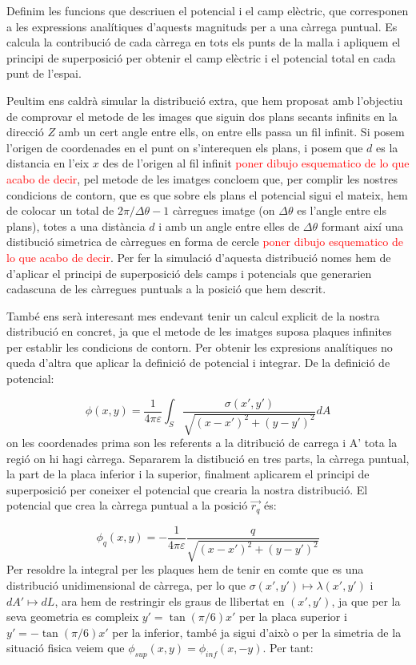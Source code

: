 \documentclass[a4paper,10.5pt]{report}
\begin{document}
Definim les funcions que descriuen el potencial i el camp elèctric, que corresponen a les expressions analítiques d'aquests magnituds per a una càrrega puntual. Es calcula la contribució de cada càrrega en tots els punts de la malla i  apliquem el principi de superposició per obtenir el camp elèctric i el potencial total en cada punt de l’espai.

Peultim ens caldrà simular la distribució extra, que hem proposat amb l'objectiu de comprovar el metode de les images que siguin dos plans secants infinits en la direcció $Z$ amb un cert angle entre ells, on entre ells passa un fil infinit. Si posem l'origen de coordenades en el punt on s'interequen els plans, i posem que $d$ es la distancia en l'eix $x$ des de l'origen al fil infinit \textcolor{red}{poner dibujo esquematico de  lo que acabo de decir}, pel metode de les imatges concloem que, per complir les nostres condicions de contorn, que es que sobre els plans el potencial sigui el mateix, hem de colocar un total de $2\pi/\Delta\theta-1$ càrregues imatge (on $\Delta\theta$ es l'angle entre els plans), totes a una distància $d$ i amb un angle entre elles de $\Delta\theta$ formant així una distibució simetrica de càrregues en forma de cercle \textcolor{red}{poner dibujo esquematico de lo que acabo de decir}. 
Per fer la simulació d'aquesta distribució nomes hem de d'aplicar el principi de superposició dels camps i potencials que generarien cadascuna de les càrregues puntuals a la posició que hem descrit.

També ens serà interesant mes endevant tenir un calcul explicit de la nostra distribució en concret, ja que el metode de les imatges suposa plaques infinites per establir les condicions de contorn. Per obtenir les expresions analítiques no queda d'altra que aplicar la definició de potencial i integrar. De la definició de potencial:

\begin{equation}
	\phi (x,y) = \frac{1}{4\pi\varepsilon}\int_S\frac{\sigma(x',y')}{\sqrt{(x-x')^2+(y-y')^2}}dA
\end{equation}
on les coordenades prima son les referents a la ditribució de carrega i A' tota la regió on hi hagi càrrega. Separarem la distibució en tres parts, la càrrega puntual, la part de la placa inferior i la superior, finalment aplicarem el principi de superposició per coneixer el potencial que crearia la nostra distribució. El potencial que crea la càrrega puntual a la posició $\vec{r_q}$ és:

\begin{equation}
	\phi_q (x,y) = -\frac{1}{4\pi\varepsilon}\frac{q}{\sqrt{(x-x')^2+(y-y')^2}}
\end{equation}
Per resoldre la integral per les plaques hem de tenir en comte que es una distribució unidimensional de càrrega, per lo que $\sigma(x',y') \longmapsto \lambda(x',y')$ i $dA' \longmapsto dL$, ara hem de restringir els graus de llibertat en $(x',y')$, ja que per la seva geometria es compleix $y' = \tan(\pi/6)x'$ per la placa superior i $y' = -\tan(\pi/6)x'$ per la inferior, també ja sigui d'això o per la simetria de la situació fisica veiem que $\phi_{sup}(x,y) = \phi_{inf}(x,-y)$. Per tant:
\end{document}
